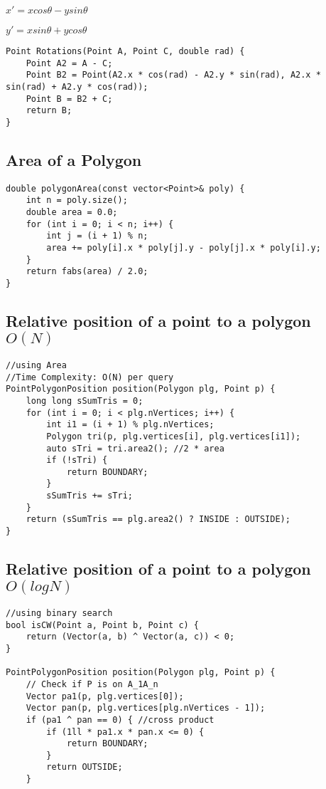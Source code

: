 \documentclass[11pt,a4paper]{article}
\begin{document}
\begin{multicols*}{2}
$x' = xcos\theta - ysin\theta$


$y' = xsin\theta + ycos\theta$
\begin{lstlisting}
Point Rotations(Point A, Point C, double rad) {
    Point A2 = A - C;
    Point B2 = Point(A2.x * cos(rad) - A2.y * sin(rad), A2.x * sin(rad) + A2.y * cos(rad));
    Point B = B2 + C;
    return B;
}
\end{lstlisting}

\subsection{Area of a Polygon}
\begin{lstlisting}
double polygonArea(const vector<Point>& poly) {
    int n = poly.size();
    double area = 0.0;
    for (int i = 0; i < n; i++) {
        int j = (i + 1) % n;
        area += poly[i].x * poly[j].y - poly[j].x * poly[i].y;
    }
    return fabs(area) / 2.0;
}
\end{lstlisting}

\subsection{Relative position of a point to a polygon $O(N)$}
\begin{lstlisting}
//using Area
//Time Complexity: O(N) per query 
PointPolygonPosition position(Polygon plg, Point p) {
    long long sSumTris = 0;
    for (int i = 0; i < plg.nVertices; i++) {
        int i1 = (i + 1) % plg.nVertices;
        Polygon tri(p, plg.vertices[i], plg.vertices[i1]);
        auto sTri = tri.area2(); //2 * area
        if (!sTri) {
            return BOUNDARY;
        }
        sSumTris += sTri;
    }
    return (sSumTris == plg.area2() ? INSIDE : OUTSIDE);
}
\end{lstlisting}

\subsection{Relative position of a point to a polygon $O(logN)$}
\begin{lstlisting}
//using binary search
bool isCW(Point a, Point b, Point c) {
    return (Vector(a, b) ^ Vector(a, c)) < 0;
}

PointPolygonPosition position(Polygon plg, Point p) {
    // Check if P is on A_1A_n 
    Vector pa1(p, plg.vertices[0]);
    Vector pan(p, plg.vertices[plg.nVertices - 1]);
    if (pa1 ^ pan == 0) { //cross product
        if (1ll * pa1.x * pan.x <= 0) {
            return BOUNDARY;
        }
        return OUTSIDE;
    }


\end{lstlisting}
\end{multicols*}
\end{document}
